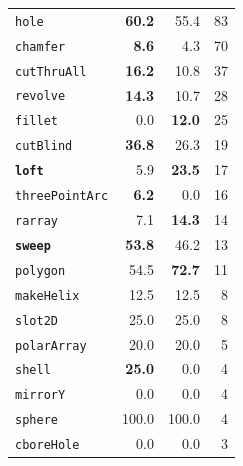 \begin{table}[t]
\begin{tabular}{lrrr}
  \texttt{hole}                 & \textbf{60.2} & 55.4          & 83  \\                                               
  \texttt{chamfer}              & \textbf{8.6}  & 4.3           & 70  \\                                               
  \texttt{cutThruAll}           & \textbf{16.2} & 10.8          & 37  \\                                               
  \texttt{revolve}              & \textbf{14.3} & 10.7          & 28  \\                                               
  \texttt{fillet}               & 0.0           & \textbf{12.0} & 25  \\
  \texttt{cutBlind}             & \textbf{36.8} & 26.3          & 19  \\                                               
  \textbf{\texttt{loft}}        & 5.9           & \textbf{23.5} & 17  \\
  \texttt{threePointArc}        & \textbf{6.2}  & 0.0           & 16  \\                                               
  \texttt{rarray}               & 7.1           & \textbf{14.3} & 14  \\                                               
  \textbf{\texttt{sweep}}       & \textbf{53.8} & 46.2          & 13  \\                                               
  \texttt{polygon}              & 54.5          & \textbf{72.7} & 11  \\                                               
  \texttt{makeHelix}            & 12.5          & 12.5          & 8   \\                                               
  \texttt{slot2D}               & 25.0          & 25.0          & 8   \\                                               
  \texttt{polarArray}           & 20.0          & 20.0          & 5   \\                                               
  \texttt{shell}                & \textbf{25.0} & 0.0           & 4   \\
  \texttt{mirrorY}              & 0.0           & 0.0           & 4   \\                                               
  \texttt{sphere}               & 100.0         & 100.0         & 4   \\
  \texttt{cboreHole}            & 0.0           & 0.0           & 3   \\                                               

\end{tabular}
\end{table}
